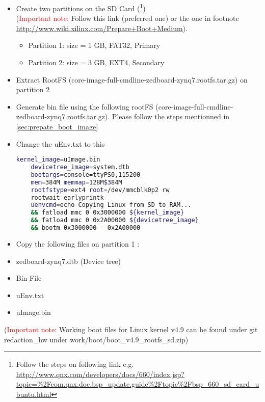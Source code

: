 \begin{itemize}
	\item Create two partitions on the SD Card (\footnote{Follow the steps on following link e.g.  \url{http://www.qnx.com/developers/docs/660/index.jsp?topic=\%2Fcom.qnx.doc.bsp_update.guide\%2Ftopic\%2Fbsp\_660\_sd\_card\_ubuntu.html} }) \\(\textcolor{red}{Important note:} Follow this link (preferred one) or the one in footnote \url{http://www.wiki.xilinx.com/Prepare+Boot+Medium}).
	\begin{itemize}
		\item Partition 1: size = 1 GB, FAT32, Primary
		\item Partition 2: size = 3 GB, EXT4, Secondary
	\end{itemize}
	\item Extract RootFS (core-image-full-cmdline-zedboard-zynq7.rootfs.tar.gz) on partition 2
	\item Generate bin file using the following rootFS (core-image-full-cmdline-zedboard-zynq7.rootfs.tar.gz). Please follow the steps mentionned in \ref{sec:prepate_boot_image}	
	\item Change the uEnv.txt to this 
	\begin{lstlisting}[language=bash]
	kernel_image=uImage.bin
	devicetree_image=system.dtb
	bootargs=console=ttyPS0,115200 
	mem=384M memmap=128M$384M 
	rootfstype=ext4 root=/dev/mmcblk0p2 rw 
	rootwait earlyprintk
	uenvcmd=echo Copying Linux from SD to RAM... 
	&& fatload mmc 0 0x3000000 ${kernel_image} 
	&& fatload mmc 0 0x2A00000 ${devicetree_image} 
	&& bootm 0x3000000 - 0x2A00000
	\end{lstlisting}
	\item Copy the following files on partition 1 : 
	\item zedboard-zynq7.dtb (Device tree)
	\item Bin File
	\item uEnv.txt
	\item uImage.bin
\end{itemize}
 (\textcolor{red}{Important note:} Working boot files for Linux kernel v4.9 can be found under git redaction\_hw under work/boot/boot\_v4.9\_rootfs\_sd.zip)